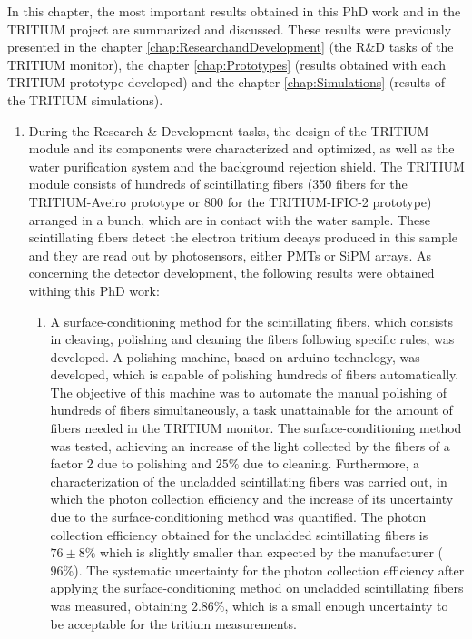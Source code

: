 In this chapter, the most important results obtained in this PhD work and in the TRITIUM project are summarized and discussed. These results were previously presented in the chapter \ref{chap:ResearchandDevelopment} (the R\&D tasks of the TRITIUM monitor), the chapter \ref{chap:Prototypes} (results obtained with each TRITIUM prototype developed) and the chapter \ref{chap:Simulations} (results of the TRITIUM simulations).


\begin{enumerate}
\item{} During the Research \& Development tasks, the design of the TRITIUM module and its components were characterized and optimized, as well as the water purification system and the background rejection shield. The TRITIUM module consists of hundreds of scintillating fibers (350 fibers for the TRITIUM-Aveiro prototype or 800 for the TRITIUM-IFIC-2 prototype) arranged in a bunch, which are in contact with the water sample. These scintillating fibers detect the electron tritium decays produced in this sample and they are read out by photosensors, either PMTs or SiPM arrays. As concerning the detector development, the following results were obtained withing this PhD work:

\begin{enumerate}
\item{} A surface-conditioning method for the scintillating fibers, which consists in cleaving, polishing and cleaning the fibers following specific rules, was developed. A polishing machine, based on arduino technology, was developed, which is capable of polishing hundreds of fibers automatically. The objective of this machine was to automate the manual polishing of hundreds of fibers simultaneously, a task unattainable for the amount of fibers needed in the TRITIUM monitor. The surface-conditioning method was tested, achieving an increase of the light collected by the fibers of a factor 2 due to polishing and $25\%$ due to cleaning. Furthermore, a characterization of the uncladded scintillating fibers was carried out, in which the photon collection efficiency and the increase of its uncertainty due to the surface-conditioning method was quantified. The photon collection efficiency obtained for the uncladded scintillating fibers is $76\pm 8\%$ which is slightly smaller than expected by the manufacturer ($96\%$). The systematic uncertainty for the photon collection efficiency after applying the surface-conditioning method on uncladded scintillating fibers was measured, obtaining $2.86\%$, which is a small enough uncertainty to be acceptable for the tritium measurements.


\end{enumerate}
\end{enumerate}
